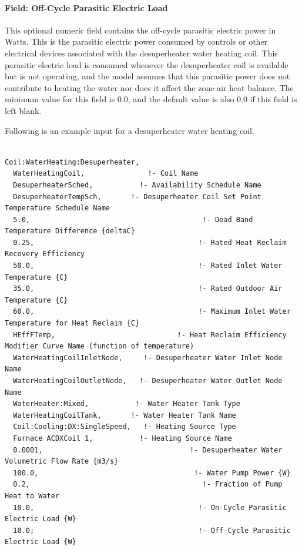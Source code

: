 \paragraph{Field: Off-Cycle Parasitic Electric Load}\label{field-off-cycle-parasitic-electric-load}

This optional numeric field contains the off-cycle parasitic electric power in Watts. This is the parasitic electric power consumed by controls or other electrical devices associated with the desuperheater water heating coil. This parasitic electric load is consumed whenever the desuperheater coil is available but is not operating, and the model assumes that this parasitic power does not contribute to heating the water nor does it affect the zone air heat balance. The minimum value for this field is 0.0, and the default value is also 0.0 if this field is left blank.

Following is an example input for a desuperheater water heating coil.

\begin{lstlisting}

Coil:WaterHeating:Desuperheater,
  WaterHeatingCoil,               !- Coil Name
  DesuperheaterSched,           !- Availability Schedule Name
  DesuperheaterTempSch,       !- Desuperheater Coil Set Point Temperature Schedule Name
  5.0,                                         !- Dead Band Temperature Difference {deltaC}
  0.25,                                       !- Rated Heat Reclaim Recovery Efficiency
  50.0,                                       !- Rated Inlet Water Temperature {C}
  35.0,                                       !- Rated Outdoor Air Temperature {C}
  60.0,                                       !- Maximum Inlet Water Temperature for Heat Reclaim {C}
  HEffFTemp,                             !- Heat Reclaim Efficiency Modifier Curve Name (function of temperature)
  WaterHeatingCoilInletNode,     !- Desuperheater Water Inlet Node Name
  WaterHeatingCoilOutletNode,   !- Desuperheater Water Outlet Node Name
  WaterHeater:Mixed,           !- Water Heater Tank Type
  WaterHeatingCoilTank,       !- Water Heater Tank Name
  Coil:Cooling:DX:SingleSpeed,   !- Heating Source Type
  Furnace ACDXCoil 1,           !- Heating Source Name
  0.0001,                                   !- Desuperheater Water Volumetric Flow Rate {m3/s}
  100.0,                                     !- Water Pump Power {W}
  0.2,                                         !- Fraction of Pump Heat to Water
  10.0,                                       !- On-Cycle Parasitic Electric Load {W}
  10.0;                                       !- Off-Cycle Parasitic Electric Load {W}
\end{lstlisting}

